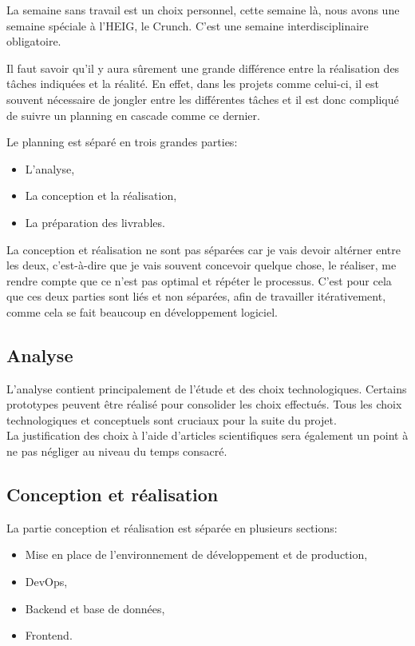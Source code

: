 \documentclass[
    iai, %
    il, %
]{heig-tb}
\begin{document}
La semaine sans travail est un choix personnel, cette semaine là, nous avons une semaine spéciale à l'HEIG, le Crunch. C'est une semaine interdisciplinaire obligatoire.

Il faut savoir qu'il y aura sûrement une grande différence entre la réalisation des tâches indiquées
et la réalité. En effet, dans les projets comme celui-ci, il est souvent nécessaire de jongler entre
les différentes tâches et il est donc compliqué de suivre un planning en cascade comme ce dernier.

Le planning est séparé en trois grandes parties:
\begin{itemize}
    \item L'analyse,
    \item La conception et la réalisation,
    \item La préparation des livrables.
\end{itemize}

La conception et réalisation ne sont pas séparées car je vais devoir altérner entre les deux,
c'est-à-dire que je vais souvent concevoir quelque chose, le réaliser, me rendre compte que ce n'est
pas optimal et répéter le processus. C'est pour cela que ces deux parties sont liés et non séparées,
afin de travailler itérativement, comme cela se fait beaucoup en développement logiciel.

\subsection{Analyse}
L'analyse contient principalement de l'étude et des choix technologiques. Certains prototypes peuvent être réalisé pour consolider les choix effectués. Tous les choix technologiques et conceptuels sont cruciaux pour la suite du projet.\\
La justification des choix à l'aide d'articles scientifiques sera également un point à ne pas négliger au niveau du temps consacré.

\subsection{Conception et réalisation}
La partie conception et réalisation est séparée en plusieurs sections:
\begin{itemize}
    \item Mise en place de l'environnement de développement et de production,
    \item DevOps,
    \item Backend et base de données,
    \item Frontend.
\end{itemize}
\end{document}
